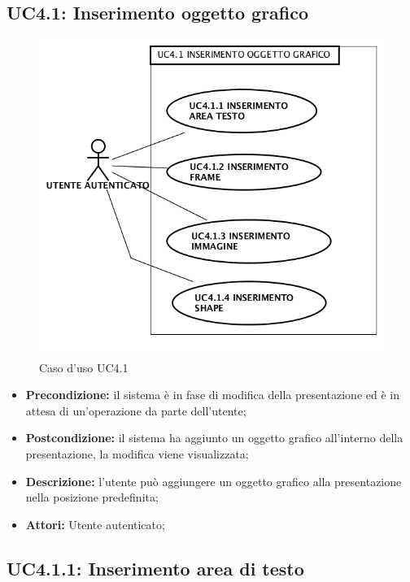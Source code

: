 \subsection{ UC4.1: Inserimento oggetto grafico}

\begin{figure}[h]
	\begin{center}
	\includegraphics[scale=0.4]{diagram/UC4-1.png}
	\caption{Caso d'uso UC4.1}
	\end{center}
\end{figure}
\begin{itemize}
	\item \textbf{Precondizione:} il sistema è in fase di modifica della presentazione ed è in attesa di un'operazione da parte dell'utente;
	\item \textbf{Postcondizione:} il sistema ha aggiunto un oggetto grafico all'interno della presentazione, la modifica viene visualizzata;
	\item \textbf{Descrizione:} l'utente può aggiungere un oggetto grafico alla presentazione nella posizione predefinita;
	\item \textbf{Attori:} Utente autenticato;
\end{itemize}
\subsection{ UC4.1.1: Inserimento area di testo}

